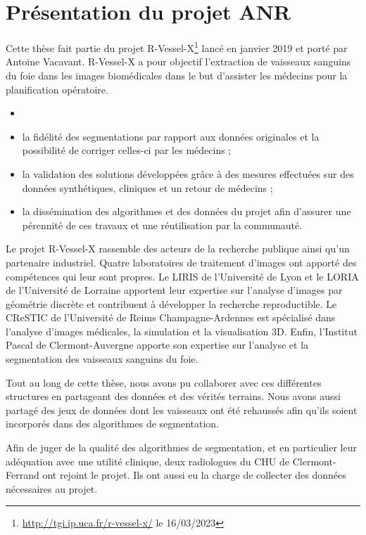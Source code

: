 \section{Présentation du projet ANR}
\label{sec:introduction:objectifs}
Cette thèse fait partie du projet R-Vessel-X\footnote{\url{http://tgi.ip.uca.fr/r-vessel-x/} le 16/03/2023} lancé en janvier 2019 et porté par Antoine Vacavant. R-Vessel-X a pour objectif l'extraction de vaisseaux sanguins du foie dans les images biomédicales dans le but d'assister les médecins pour la planification opératoire. 
\begin{itemize}
\item {}
\item la fidélité des segmentations par rapport aux données originales et la possibilité de corriger celles-ci par les médecins ;
\item la validation des solutions développées grâce à des mesures effectuées sur des données synthétiques, cliniques et un retour de médecins ;
\item la dissémination des algorithmes et des données du projet afin d'assurer une pérennité de ces travaux et une réutilisation par la communauté.
\end{itemize}
Le projet R-Vessel-X rassemble des acteurs de la recherche publique ainsi qu'un partenaire industriel. Quatre laboratoires de traitement d'images ont apporté des compétences qui leur sont propres. Le LIRIS de l'Université de Lyon et le LORIA de l'Université de Lorraine apportent leur expertise sur l'analyse d'images par géométrie discrète et contribuent à développer la recherche reproductible. Le CReSTIC de l'Université de Reims Champagne-Ardennes est spécialisé dans l'analyse d'images médicales, la simulation et la visualisation 3D. Enfin, l'Institut Pascal de Clermont-Auvergne apporte son expertise sur l'analyse et la segmentation des vaisseaux sanguins du foie. 

Tout au long de cette thèse, nous avons pu collaborer avec ces différentes structures en partageant des données et des vérités terrains. Nous avons aussi partagé des jeux de données dont les vaisseaux ont été rehaussés afin qu'ils soient incorporés dans des algorithmes de segmentation.

Afin de juger de la qualité des algorithmes de segmentation, et en particulier leur adéquation avec une utilité clinique, deux radiologues du CHU de Clermont-Ferrand ont rejoint le projet. Ils ont aussi eu la charge de collecter des données nécessaires au projet.


